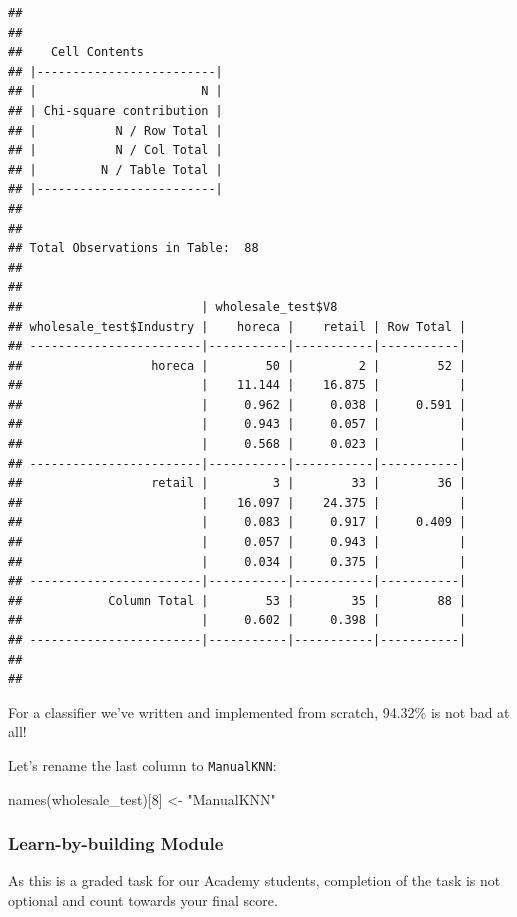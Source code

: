 \documentclass[
]{article}
\newenvironment{Shaded}{\begin{snugshade}}{\end{snugshade}}
\newcommand{\DecValTok}[1]{\textcolor[rgb]{0.00,0.00,0.81}{#1}}
\newcommand{\FunctionTok}[1]{\textcolor[rgb]{0.00,0.00,0.00}{#1}}
\newcommand{\NormalTok}[1]{#1}
\newcommand{\OtherTok}[1]{\textcolor[rgb]{0.56,0.35,0.01}{#1}}
\newcommand{\StringTok}[1]{\textcolor[rgb]{0.31,0.60,0.02}{#1}}
\begin{document}
\begin{verbatim}
## 
##  
##    Cell Contents
## |-------------------------|
## |                       N |
## | Chi-square contribution |
## |           N / Row Total |
## |           N / Col Total |
## |         N / Table Total |
## |-------------------------|
## 
##  
## Total Observations in Table:  88 
## 
##  
##                         | wholesale_test$V8 
## wholesale_test$Industry |    horeca |    retail | Row Total | 
## ------------------------|-----------|-----------|-----------|
##                  horeca |        50 |         2 |        52 | 
##                         |    11.144 |    16.875 |           | 
##                         |     0.962 |     0.038 |     0.591 | 
##                         |     0.943 |     0.057 |           | 
##                         |     0.568 |     0.023 |           | 
## ------------------------|-----------|-----------|-----------|
##                  retail |         3 |        33 |        36 | 
##                         |    16.097 |    24.375 |           | 
##                         |     0.083 |     0.917 |     0.409 | 
##                         |     0.057 |     0.943 |           | 
##                         |     0.034 |     0.375 |           | 
## ------------------------|-----------|-----------|-----------|
##            Column Total |        53 |        35 |        88 | 
##                         |     0.602 |     0.398 |           | 
## ------------------------|-----------|-----------|-----------|
## 
## 
\end{verbatim}

For a classifier we've written and implemented from scratch, 94.32\% is
not bad at all!

Let's rename the last column to \texttt{ManualKNN}:

\begin{Shaded}
\begin{Highlighting}[]
\FunctionTok{names}\NormalTok{(wholesale\_test)[}\DecValTok{8}\NormalTok{] }\OtherTok{\textless{}{-}} \StringTok{"ManualKNN"}
\end{Highlighting}
\end{Shaded}

\hypertarget{learn-by-building-module}{%
\subsubsection{Learn-by-building
Module}\label{learn-by-building-module}}

As this is a graded task for our Academy students, completion of the
task is not optional and count towards your final score.
\end{document}
